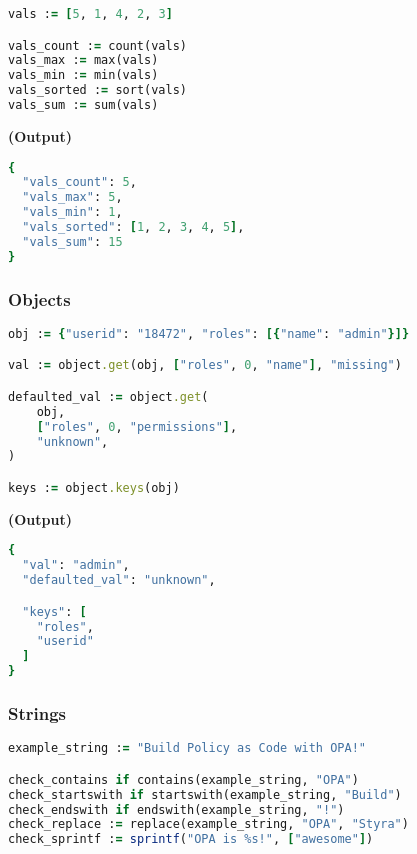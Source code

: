 \documentclass[twocolumn]{article}
\begin{document}
\begin{lstlisting}[language=Ruby]
vals := [5, 1, 4, 2, 3]

vals_count := count(vals)
vals_max := max(vals)
vals_min := min(vals)
vals_sorted := sort(vals)
vals_sum := sum(vals)
\end{lstlisting}



\textbf{\tiny{(Output)}}
\begin{lstlisting}[language=Ruby]
{
  "vals_count": 5,
  "vals_max": 5,
  "vals_min": 1,
  "vals_sorted": [1, 2, 3, 4, 5],
  "vals_sum": 15
}
\end{lstlisting}



\vspace{-1em}
\subsubsection*{Objects}



\begin{lstlisting}[language=Ruby]
obj := {"userid": "18472", "roles": [{"name": "admin"}]}

val := object.get(obj, ["roles", 0, "name"], "missing")

defaulted_val := object.get(
	obj,
	["roles", 0, "permissions"],
	"unknown",
)

keys := object.keys(obj)
\end{lstlisting}



\textbf{\tiny{(Output)}}
\begin{lstlisting}[language=Ruby]
{
  "val": "admin",
  "defaulted_val": "unknown",

  "keys": [
    "roles",
    "userid"
  ]
}
\end{lstlisting}



\vspace{-1em}
\subsubsection*{Strings}



\begin{lstlisting}[language=Ruby]
example_string := "Build Policy as Code with OPA!"

check_contains if contains(example_string, "OPA")
check_startswith if startswith(example_string, "Build")
check_endswith if endswith(example_string, "!")
check_replace := replace(example_string, "OPA", "Styra")
check_sprintf := sprintf("OPA is %s!", ["awesome"])
\end{lstlisting}
\end{document}
